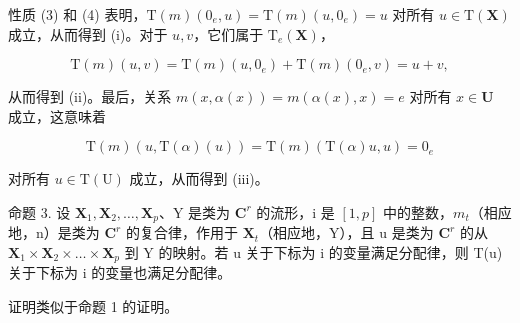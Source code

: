 性质 (3) 和 (4) 表明，\(\mathrm{T}(m)(0_e,u) = \mathrm{T}(m)(u,0_e) = u\) 对所有 \(u\in \mathrm{T}(\mathbf{X})\) 成立，从而得到 (i)。对于 \(u,v\)，它们属于 \(\mathrm{T}_e(\mathbf{X})\)，

\[
\mathrm{T} (m) (u, v) = \mathrm{T} (m) (u, 0 _ {e}) + \mathrm{T} (m) (0 _ {e}, v) = u + v,
\]

从而得到 (ii)。最后，关系 \(m(x, \alpha(x)) = m(\alpha(x), x) = e\) 对所有 \(x \in \mathbf{U}\) 成立，这意味着

\[
\mathrm{T} (m) (u, \mathrm{T} (\alpha) (u)) = \mathrm{T} (m) (\mathrm{T} (\alpha) u, u) = 0 _ {e}
\]

对所有 \(u \in \mathrm{T}(\mathrm{U})\) 成立，从而得到 (iii)。

命题 3. 设 \(\mathbf{X}_1, \mathbf{X}_2, \ldots, \mathbf{X}_p\)、Y 是类为 \(\mathbf{C}^r\) 的流形，i 是 \([1, p]\) 中的整数，\(m_t\)（相应地，n）是类为 \(\mathbf{C}^r\) 的复合律，作用于 \(\mathbf{X}_t\)（相应地，Y），且 u 是类为 \(\mathbf{C}^r\) 的从 \(\mathbf{X}_1 \times \mathbf{X}_2 \times \dots \times \mathbf{X}_p\) 到 Y 的映射。若 u 关于下标为 i 的变量满足分配律，则 T(u) 关于下标为 i 的变量也满足分配律。

证明类似于命题 1 的证明。

